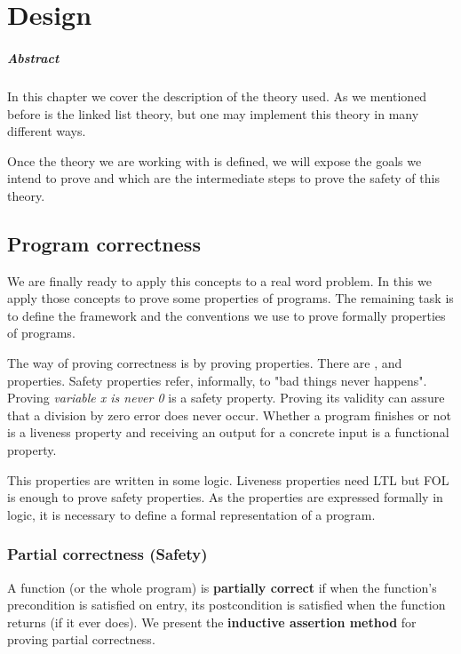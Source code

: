 \chapter{Design\label{chap:design}}

\paragraph{Abstract} In this chapter we cover the description of the theory used. As we mentioned before is the linked list theory, but one may implement this theory in many different ways. 

Once the theory we are working with is defined, we will expose the goals we intend to prove and which are the intermediate steps to prove the safety of this theory.


\section{Program correctness}


We are finally ready to apply this concepts to a real word problem. In this \thisworkm we apply those concepts to prove some properties of programs.
%
The remaining task is to define the framework and the conventions we use to prove formally properties of programs.

The way of proving correctness is by proving properties. 
%
There are ,  and  properties. 
%
Safety properties refer, informally, to "bad things never happens". Proving \textit{ variable x is never 0 } is a safety property. 
%
Proving its validity can assure that a division by zero error does never occur. 
%
Whether a program finishes or not is a liveness property and receiving an output for a concrete input is a functional property. 

This properties are written in some logic. Liveness properties need \gls{LTL} but \gls{FOL} is enough to prove safety properties. 
%
As the properties are expressed formally in logic, it is necessary to define a formal representation of a program.


\label{def:SPL}



\subsection{Partial correctness (Safety)}

A function (or the whole program) is \textbf{partially correct} if when the function's precondition is satisfied on entry, its postcondition is satisfied when the function returns (if it ever does).
%
We present the \textbf{inductive assertion method} for proving partial correctness.


